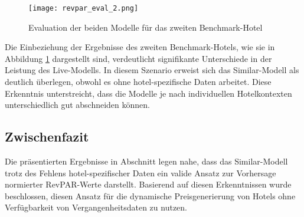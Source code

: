 \begin{figure}[h]
    \centering
    \texttt{[image: revpar\_eval\_2.png]}
    \caption[Evaluation der beiden Modelle für das zweiten Benchmark-Hotel]{Evaluation der beiden Modelle für das zweiten Benchmark-Hotel}
    \label{img:revpar_eval_2}
\end{figure}

Die Einbeziehung der Ergebnisse des zweiten Benchmark-Hotels, wie sie in Abbildung \ref{img:revpar_eval_2} dargestellt sind, verdeutlicht signifikante Unterschiede in der Leistung des Live-Modells. In diesem Szenario erweist sich das Similar-Modell als deutlich überlegen, obwohl es ohne hotel-spezifische Daten arbeitet. Diese Erkenntnis unterstreicht, dass die Modelle je nach individuellen Hotelkontexten unterschiedlich gut abschneiden können.

\subsection{Zwischenfazit}
\label{subsec:revpar_fazit}
Die präsentierten Ergebnisse in Abschnitt \emph{} legen nahe, dass das Similar-Modell trotz des Fehlens hotel-spezifischer Daten ein valide Ansatz zur Vorhersage normierter RevPAR-Werte darstellt. Basierend auf diesen Erkenntnissen wurde beschlossen, diesen Ansatz für die dynamische Preisgenerierung von Hotels ohne Verfügbarkeit von Vergangenheitsdaten zu nutzen.


